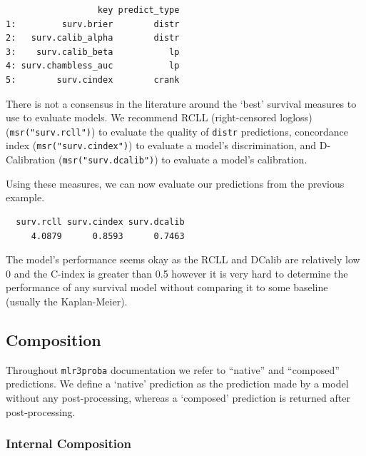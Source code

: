 \begin{verbatim}
                  key predict_type
1:         surv.brier        distr
2:   surv.calib_alpha        distr
3:    surv.calib_beta           lp
4: surv.chambless_auc           lp
5:        surv.cindex        crank
\end{verbatim}

There is not a consensus in the literature around the `best' survival
measures to use to evaluate models. We recommend RCLL (right-censored
logloss) (\texttt{msr("surv.rcll")}) to evaluate the quality of
\texttt{distr} predictions, concordance index
(\texttt{msr("surv.cindex")}) to evaluate a model's discrimination, and
D-Calibration (\texttt{msr("surv.dcalib")}) to evaluate a model's
calibration.

Using these measures, we can now evaluate our predictions from the
previous example.

\begin{Shaded}
\begin{Highlighting}[]
\SpecialCharTok{$}\NormalTok{(}\NormalTok{(}\NormalTok{(}\NormalTok{, }\NormalTok{, }\NormalTok{)))}
\end{Highlighting}
\end{Shaded}

\begin{verbatim}
  surv.rcll surv.cindex surv.dcalib 
     4.0879      0.8593      0.7463 
\end{verbatim}

The model's performance seems okay as the RCLL and DCalib are relatively
low 0 and the C-index is greater than 0.5 however it is very hard to
determine the performance of any survival model without comparing it to
some baseline (usually the Kaplan-Meier).

\hypertarget{sec-surv-comp}{%
\subsection{Composition}\label{sec-surv-comp}}

Throughout \texttt{mlr3proba} documentation we refer to ``native'' and
``composed'' predictions. We define a `native' prediction as the
prediction made by a model without any post-processing, whereas a
`composed' prediction is returned after post-processing.

\hypertarget{internal-composition}{%
\subsubsection{Internal Composition}\label{internal-composition}}

